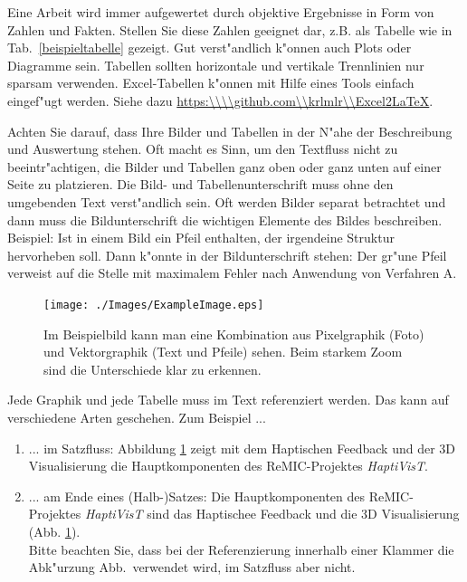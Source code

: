 \documentclass[12pt,a4paper,headinclude,twoside, plainheadsepline, open=right,numbers=noenddot]{scrreprt}
\begin{document}
Eine Arbeit wird immer aufgewertet durch objektive Ergebnisse in Form von Zahlen und Fakten.
Stellen Sie diese Zahlen geeignet dar, z.B. als Tabelle wie in Tab.~\ref{beispieltabelle} gezeigt.
Gut verst"andlich k"onnen auch Plots oder Diagramme sein.
Tabellen sollten horizontale und vertikale Trennlinien nur sparsam verwenden.
Excel-Tabellen k"onnen mit Hilfe eines Tools einfach eingef"ugt werden.
Siehe dazu \url{https:\\\\github.com\\krlmlr\\Excel2LaTeX}.

Achten Sie darauf, dass Ihre Bilder und Tabellen in der N"ahe der Beschreibung und Auswertung stehen.
Oft macht es Sinn, um den Textfluss nicht zu beeintr"achtigen, die Bilder und Tabellen ganz oben oder ganz unten auf einer Seite zu platzieren.
Die Bild- und Tabellenunterschrift muss ohne den umgebenden Text verst"andlich sein.
Oft werden Bilder separat betrachtet und dann muss die Bildunterschrift die wichtigen Elemente des Bildes beschreiben.
Beispiel: Ist in einem Bild ein Pfeil enthalten, der irgendeine Struktur hervorheben soll.
Dann k"onnte in der Bildunterschrift stehen: Der gr"une Pfeil verweist auf die Stelle mit maximalem Fehler nach Anwendung von Verfahren A.

\begin{figure}[tb]
\begin{center}
 \texttt{[image: ./Images/ExampleImage.eps]}
\caption{{Im Beispielbild kann man eine Kombination aus Pixelgraphik (Foto) und Vektorgraphik (Text und Pfeile) sehen.
Beim starkem Zoom sind die Unterschiede klar zu erkennen.}\label{beispielbild}}
\end{center}
\end{figure}

Jede Graphik und jede Tabelle muss im Text referenziert werden.
Das kann auf verschiedene Arten geschehen. Zum Beispiel ...
\begin{enumerate}
\item ... im Satzfluss: Abbildung \ref{beispielbild} zeigt mit dem Haptischen Feedback und der 3D Visualisierung die Hauptkomponenten des ReMIC-Projektes \emph{HaptiVisT}.
\item ... am Ende eines (Halb-)Satzes:  Die Hauptkomponenten des ReMIC-Projektes \emph{HaptiVisT} sind das Haptischee Feedback und die 3D Visualisierung (Abb. \ref{beispielbild}).\\
Bitte beachten Sie, dass bei der Referenzierung innerhalb einer Klammer die Abk"urzung Abb.~verwendet wird, im Satzfluss aber nicht.
\end{enumerate}
\end{document}

